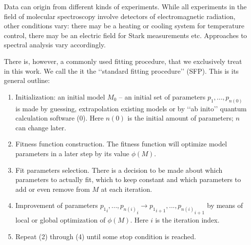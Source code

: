 \documentclass[11pt]{article}
\begin{document}
Data can origin from different kinds of experiments. While all experiments in the field of molecular spectroscopy involve detectors of electromagnetic radiation, other conditions vary: there may be a heating or cooling system for temperature control, there may be an electric field for Stark measurements etc. Approaches to spectral analysis vary accordingly. 

There is, however, a commonly used fitting procedure, that we exclusively treat in this work. We call the it the \lq\lq{}standard fitting procedure\rq\rq{} (SFP). This is its  general outline:

\begin{enumerate}
	\item Initialization: an initial model $M_0$ -- an initial set of parameters  ${p_1}, ..., {p_{n(0)}}$ is made by guessing, extrapolation existing models or by \lq\lq{}ab inito\rq\rq{} quantum calculation software (0). Here $n(0)$ is the initial amount of parameters; $n$ can change later. 
	\item Fitness function construction. The fitness function will optimize model parameters in a later step by its value $\phi(M)$.
	\item Fit parameters selection. There is a decision to be made about which parameters to actually fit, which to keep constant and which parameters to add or even remove from $M$ at each iteration.
	\item Improvement of parameters ${p_1}_i, ..., {p_{n(i)}}_i \rightarrow {p_1}_{i + 1}, ..., {p_{n(i)}}_{i + 1}$ by means of local or global optimization of $\phi(M)$. Here $i$ is the iteration index.
	\item Repeat (2) through (4) until some stop condition is reached.
	
\end{enumerate}
\end{document}
